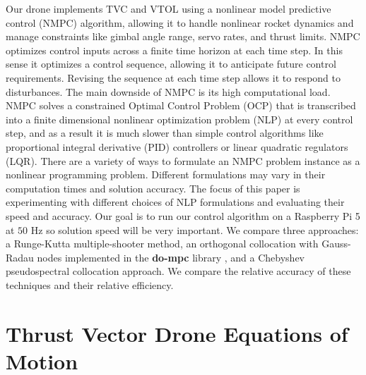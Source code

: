 \documentclass[]{article}
\begin{document}
	Our drone implements TVC and VTOL using a nonlinear model predictive control (NMPC) algorithm, allowing it to handle nonlinear rocket dynamics and manage constraints like gimbal angle range, servo rates, and thrust limits. NMPC optimizes control inputs across a finite time horizon at each time step. In this sense it optimizes a control sequence, allowing it to anticipate future control requirements. Revising the sequence at each time step allows it to respond to disturbances. The main downside of NMPC is its high computational load. NMPC solves a constrained Optimal Control Problem (OCP) that is transcribed into a finite dimensional nonlinear optimization problem (NLP) at every control step, and as a result it is much slower than simple control algorithms like proportional integral derivative (PID) controllers or linear quadratic regulators (LQR).
	There are a variety of ways to formulate an NMPC problem instance as a nonlinear programming problem. Different formulations may vary in their computation times and solution accuracy. The focus of this paper is experimenting with different choices of NLP formulations and evaluating their speed and accuracy.  Our goal is to run our control algorithm on a Raspberry Pi 5 at $50$ Hz so solution speed will be very important.
	We  compare three approaches: a Runge-Kutta multiple-shooter method, an orthogonal collocation with Gauss-Radau nodes implemented in the {\bf do-mpc}  library \citep{do-mpc},  and a Chebyshev pseudospectral collocation approach. We compare the relative accuracy of these techniques and their relative efficiency.

	

	
\section*{Thrust Vector Drone Equations of Motion}
	
\end{document}
